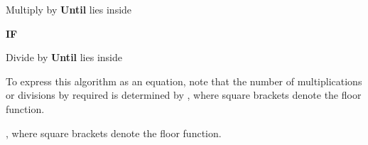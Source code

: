 \documentclass{article}
\begin{document}
\begin{Maple Normal}{
\begin{Maple Normal}{
Multiply
by
\textbf{Until}
lies inside
}\end{Maple Normal}
}\end{Maple Normal}
\begin{Maple Normal}{
\begin{Maple Normal}{
\textbf{IF}
}\end{Maple Normal}

}\end{Maple Normal}

\begin{Maple Normal}{
\begin{Maple Normal}{
Divide
by
\textbf{Until}
lies inside
}\end{Maple Normal}
}\end{Maple Normal}
\begin{Maple Normal}{
\begin{Maple Normal}{
}\end{Maple Normal}
}\end{Maple Normal}
\begin{Maple Normal}{
\begin{Maple Normal}{
}\end{Maple Normal}
}\end{Maple Normal}
\begin{Maple Normal}{
\begin{Maple Normal}{
To express this algorithm as an equation, note that the number of multiplications or divisions by
required is determined by
, where square brackets denote the floor function.}\end{Maple Normal}

\begin{Maple Normal}{
, where square brackets denote the floor function.}\end{Maple Normal}

}\end{Maple Normal}
\end{document}
